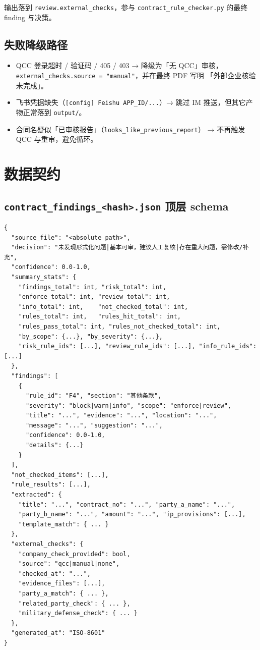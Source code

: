 \documentclass[11pt,a4paper]{article}
\begin{document}
输出落到 \texttt{review.external\_checks}，参与
\texttt{contract\_rule\_checker.py} 的最终 finding 与决策。

\subsection{失败降级路径}

\begin{itemize}[leftmargin=1.4em,itemsep=1pt]
  \item QCC 登录超时 / 验证码 / 405 / 403 → 降级为「无 QCC」审核，
    \texttt{external\_checks.source = "manual"}，并在最终 PDF 写明
    「外部企业核验未完成」。
  \item 飞书凭据缺失（\texttt{[config] Feishu APP\_ID/...}）→
    跳过 IM 推送，但其它产物正常落到 \texttt{output/}。
  \item 合同名疑似「已审核报告」（\texttt{looks\_like\_previous\_report}）
    → 不再触发 QCC 与重审，避免循环。
\end{itemize}

\section{数据契约}\label{sec:contracts}

\subsection{\texttt{contract\_findings\_<hash>.json} 顶层 schema}

\begin{lstlisting}[style=json]
{
  "source_file": "<absolute path>",
  "decision": "未发现形式化问题|基本可审，建议人工复核|存在重大问题，需修改/补充",
  "confidence": 0.0-1.0,
  "summary_stats": {
    "findings_total": int, "risk_total": int,
    "enforce_total": int, "review_total": int,
    "info_total": int,    "not_checked_total": int,
    "rules_total": int,   "rules_hit_total": int,
    "rules_pass_total": int, "rules_not_checked_total": int,
    "by_scope": {...}, "by_severity": {...},
    "risk_rule_ids": [...], "review_rule_ids": [...], "info_rule_ids": [...]
  },
  "findings": [
    {
      "rule_id": "F4", "section": "其他条款",
      "severity": "block|warn|info", "scope": "enforce|review",
      "title": "...", "evidence": "...", "location": "...",
      "message": "...", "suggestion": "...",
      "confidence": 0.0-1.0,
      "details": {...}
    }
  ],
  "not_checked_items": [...],
  "rule_results": [...],
  "extracted": {
    "title": "...", "contract_no": "...", "party_a_name": "...",
    "party_b_name": "...", "amount": "...", "ip_provisions": [...],
    "template_match": { ... }
  },
  "external_checks": {
    "company_check_provided": bool,
    "source": "qcc|manual|none",
    "checked_at": "...",
    "evidence_files": [...],
    "party_a_match": { ... },
    "related_party_check": { ... },
    "military_defense_check": { ... }
  },
  "generated_at": "ISO-8601"
}
\end{lstlisting}
\end{document}
